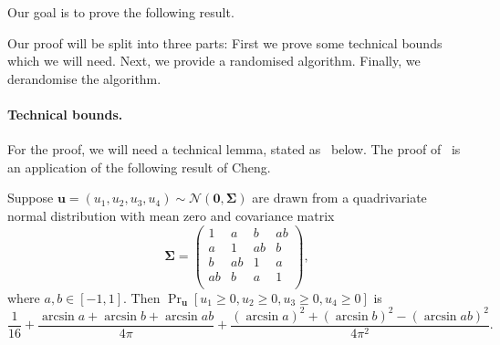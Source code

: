 \documentclass[a4paper,11pt, DIV=11]{scrartcl}
\theoremstyle{plain}
\theoremstyle{definition}
\begin{document}
Our goal is to prove the following result.

\thmktwokthree*

Our proof will be split into three parts: First we prove some technical bounds which we will need. Next, we provide a randomised algorithm. Finally, we derandomise the algorithm.

\paragraph{Technical bounds.} For the proof, we will need a technical lemma,
stated as~ below. The proof of~ is an application of the following result of Cheng.

\begin{theorem}\label{thm:cheng}
Suppose $\mathbf{u} = (u_1, u_2, u_3, u_4) \sim \mathcal{N}(\mathbf{0}, \mathbf{\Sigma})$ are drawn from a quadrivariate normal distribution with mean zero and covariance matrix
\[
\mathbf{\Sigma} =
\begin{pmatrix}
   1 & a & b & ab \\
   a & 1 & ab & b \\
   b & ab & 1 & a \\
   ab & b & a & 1 \\
\end{pmatrix},
\]
where $a, b \in [-1, 1]$. Then $\Pr_{\mathbf{u}}[u_1 \geq 0, u_2 \geq 0, u_3 \geq 0, u_4 \geq 0]$ is 
\[
\frac{1}{16} + \frac{\arcsin a + \arcsin b + \arcsin ab}{4\pi} + \frac{{(\arcsin a)}^2 + {(\arcsin b)}^2 - {(\arcsin ab)}^2}{4\pi^2}.
\]
\end{theorem}
\end{document}
